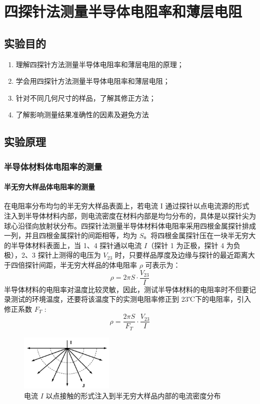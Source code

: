 \chapter{四探针法测量半导体电阻率和薄层电阻}
\section{实验目的}
    \begin{enumerate}
        \item 理解四探针方法测量半导体电阻率和薄层电阻的原理；
        \item 学会用四探针方法测量半导体电阻率和薄层电阻；
        \item 针对不同几何尺寸的样品，了解其修正方法；
        \item 了解影响测量结果准确性的因素及避免方法
    \end{enumerate}
\section{实验原理}%
    \subsection{半导体材料体电阻率的测量}
        \subsubsection{半无穷大样品体电阻率的测量}
            在电阻率分布均匀的半无穷大样品表面上，若电流 I 通过探针以点电流源的形式注入到半导体材料内部，则电流密度在材料内部是均匀分布的，具体是以探针尖为球心沿径向放射状分布。四探针法测量半导体材料体电阻率采用四根金属探针排成一列，并且四根金属探针的间距相等，均为 $S$。将四根金属探针压在一块半无穷大的半导体材料表面上，当 1、4 探针通以电流 $I$（探针 1 为正极，探针 4 为负极），2、3 探针上测得的电压为 $V_{23}$ 时，只要样品厚度及边缘与探针的最近距离大于四倍探针间距，半无穷大样品的体电阻率 $\rho$ 可表示为：
            \begin{equation}
                \rho = 2\pi S\cdot\frac{V_{23}}{I} \label{equ:A11.0}
            \end{equation}
            半导体材料的电阻率对温度比较灵敏，因此，测试半导体材料的电阻率时不但要记录测试的环境温度，还要将该温度下的实测电阻率修正到 23℃下的电阻率，引入修正系数 $F_T$ : 
            \begin{equation}
                \rho =\frac{2\pi S}{F_T}\cdot\frac{V_{23}}{I}
            \end{equation}
            \begin{figure}[!ht]
                \includegraphics[width=0.4\textwidth]{img/A11/1.jpg}
                \caption{电流 $I$ 以点接触的形式注入到半无穷大样品内部的电流密度分布}
            \end{figure}
